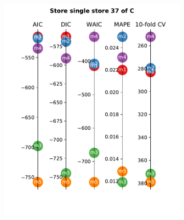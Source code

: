 \documentclass[english, 12pt, a4paper, sci, utf8, a-1b, online]{aaltothesis}
\begin{document}
\begin{figure}[hbt]
\begin{subfigure}[htb]{0.33\textwidth}
	\end{subfigure}

	\begin{subfigure}[htb]{0.3\textwidth}
		\centering
		\includegraphics[width=\textwidth]{../plots/metrics/metrics_plot_single_store_37_of_C.pdf}
	\end{subfigure}
	\hfill 
	\begin{subfigure}[htb]{0.3\textwidth}
		\centering

\end{subfigure}
\end{figure}
\end{document}

